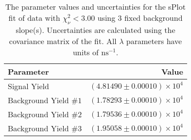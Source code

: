 
\begin{table}
    \begin{center}
        \begin{tabular}{lr}\toprule
            Parameter & Value \\\midrule
            Signal Yield & $(4.81490 \pm 0.00010) \times 10^{4}$ \\
            Background Yield $\#1$ & $(1.78293 \pm 0.00010) \times 10^{4}$ \\
            Background Yield $\#2$ & $(1.79536 \pm 0.00010) \times 10^{4}$ \\
            Background Yield $\#3$ & $(1.95058 \pm 0.00010) \times 10^{4}$ \\\bottomrule
        \end{tabular}
        \caption{The parameter values and uncertainties for the sPlot fit of data with $\chi^2_\nu < 3.00$ using 3 fixed background slope(s). Uncertainties are calculated using the covariance matrix of the fit. All $\lambda$ parameters have units of $\si{\nano\second}^{-1}$.}
    \end{center}
\end{table}
